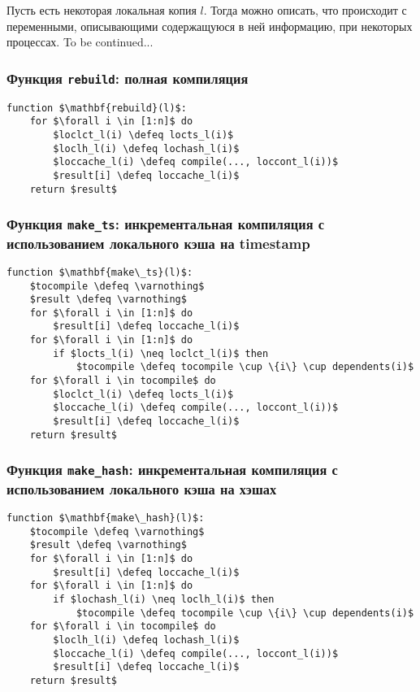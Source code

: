 Пусть есть некоторая локальная копия $l$. Тогда можно описать, что происходит с переменными, описывающими содержащуюся в ней информацию, при некоторых процессах.
To be continued...\\

\subsubsection{Функция \texttt{rebuild}: полная компиляция}
\begin{lstlisting}
function $\mathbf{rebuild}(l)$:
	for $\forall i \in [1:n]$ do
		$loclct_l(i) \defeq locts_l(i)$
		$loclh_l(i) \defeq lochash_l(i)$
		$loccache_l(i) \defeq compile(..., loccont_l(i))$
		$result[i] \defeq loccache_l(i)$
	return $result$
\end{lstlisting}

\subsubsection{Функция \texttt{make\_ts}: инкрементальная компиляция с использованием локального кэша на timestamp}
\begin{lstlisting}
function $\mathbf{make\_ts}(l)$:
	$tocompile \defeq \varnothing$
	$result \defeq \varnothing$
	for $\forall i \in [1:n]$ do
		$result[i] \defeq loccache_l(i)$
	for $\forall i \in [1:n]$ do
		if $locts_l(i) \neq loclct_l(i)$ then
			$tocompile \defeq tocompile \cup \{i\} \cup dependents(i)$
	for $\forall i \in tocompile$ do
		$loclct_l(i) \defeq locts_l(i)$
		$loccache_l(i) \defeq compile(..., loccont_l(i))$
		$result[i] \defeq loccache_l(i)$
	return $result$
\end{lstlisting}

\subsubsection{Функция \texttt{make\_hash}: инкрементальная компиляция с использованием локального кэша на хэшах}
\begin{lstlisting}
function $\mathbf{make\_hash}(l)$:
	$tocompile \defeq \varnothing$
	$result \defeq \varnothing$
	for $\forall i \in [1:n]$ do
		$result[i] \defeq loccache_l(i)$
	for $\forall i \in [1:n]$ do
		if $lochash_l(i) \neq loclh_l(i)$ then
			$tocompile \defeq tocompile \cup \{i\} \cup dependents(i)$
	for $\forall i \in tocompile$ do
		$loclh_l(i) \defeq lochash_l(i)$
		$loccache_l(i) \defeq compile(..., loccont_l(i))$
		$result[i] \defeq loccache_l(i)$
	return $result$
\end{lstlisting}

